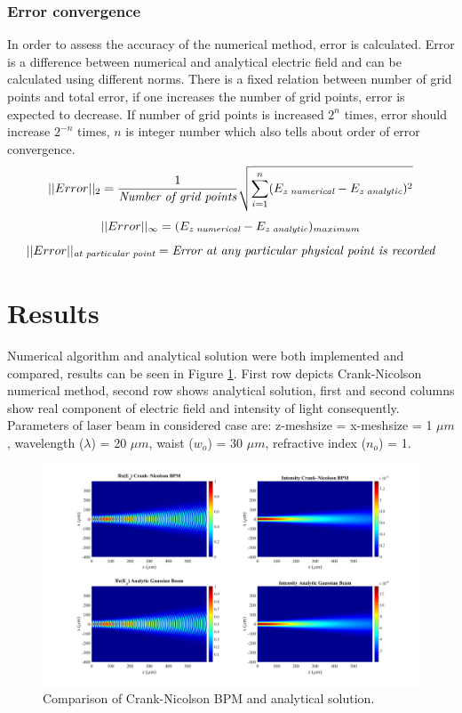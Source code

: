 \documentclass[a4paper]{article}
\begin{document}
	\subsubsection{Error convergence}	
	In order to assess the accuracy of the numerical method, error is calculated. Error is a difference between numerical and analytical electric field and can be calculated using different norms. There is a fixed relation between number of grid points and total error, if one increases the number of grid points, error is expected to decrease. If number of grid points is increased $2^n$ times, error should increase $2^{-n}$ times, $n$ is integer number which also tells about order of error convergence.
	\[||Error||_2 = \frac{1}{\text{{\it Number of grid points}}}\sqrt{\sum\limits_{i=1}^n (E_{\text{\it z numerical}}-E_{\text{\it z analytic}})^2 }
	\]
	\[
	||Error||_\infty = (E_{\text{\it z numerical}}-E_{\text{\it z analytic}})_{maximum}
	\]
	\[ ||Error||_{\text{\it at particular point}} = \text{\it Error at any particular physical point is recorded}
	\]
	\newpage
	\section{Results}
	Numerical algorithm and analytical solution were both implemented and compared, results can be seen in Figure \ref{fig:Results}. First row depicts Crank-Nicolson numerical method, second row shows analytical solution, first and second columns show real component of electric field and intensity of light consequently. Parameters of laser beam in considered case are: z-meshsize = x-meshsize  = 1 $\mu m$, wavelength ($\lambda$) = 20 $\mu m$, waist ($w_o$) = 30 $\mu m$, refractive index ($n_o$) = 1.	
	\begin{figure}[h!]
		\hspace{-30mm}
		\includegraphics[width=1.5\textwidth]{N1.jpg}
		\caption{\label{fig:Results}Comparison of Crank-Nicolson BPM and analytical solution.}
	\end{figure}
\end{document}
